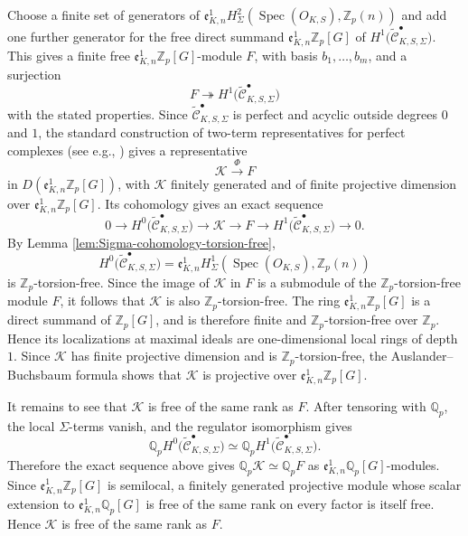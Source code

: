 \documentclass[a4paper,11pt]{article}
\newenvironment{proof}[1][Proof]{\begin{trivlist}
\item[\hskip \labelsep {\bfseries #1}]}{\end{trivlist}}
\begin{document}
\begin{proof}
Choose a finite set of generators of
\(
\mathfrak e^1_{K,n}
H^2_{\Sigma}(\operatorname{Spec}(O_{K,S}),\mathbb Z_p(n))
\)
and add one further generator for the free direct summand
\(
\mathfrak e^1_{K,n}\mathbb Z_p[G]
\)
of
\(
H^1\bigl(\widetilde{\mathcal C}_{K,S,\Sigma}^{\bullet}\bigr).
\)
This gives a finite free $\mathfrak e^1_{K,n}\mathbb Z_p[G]$-module $F$, with
basis $b_1,\ldots,b_m$, and a surjection
\[
F
\twoheadrightarrow
H^1\bigl(\widetilde{\mathcal C}_{K,S,\Sigma}^{\bullet}\bigr)
\]
with the stated properties.
Since $\widetilde{\mathcal C}_{K,S,\Sigma}^{\bullet}$ is perfect and acyclic
outside degrees $0$ and $1$, the standard construction of two-term
representatives for perfect complexes (see e.g., \cite[\S 3]{Burns00}) gives a representative
\[
\mathcal K
\stackrel{\Phi}{\longrightarrow}
F
\]
in $D(\mathfrak e^1_{K,n}\mathbb Z_p[G])$, with $\mathcal K$ finitely generated
and of finite projective dimension over
$\mathfrak e^1_{K,n}\mathbb Z_p[G]$. Its cohomology gives an exact sequence
\[
0
\longrightarrow
H^0\bigl(\widetilde{\mathcal C}_{K,S,\Sigma}^{\bullet}\bigr)
\longrightarrow
\mathcal K
\longrightarrow
F
\longrightarrow
H^1\bigl(\widetilde{\mathcal C}_{K,S,\Sigma}^{\bullet}\bigr)
\longrightarrow
0.
\]
By Lemma \ref{lem:Sigma-cohomology-torsion-free},
\[
H^0\bigl(\widetilde{\mathcal C}_{K,S,\Sigma}^{\bullet}\bigr)
=
\mathfrak e^1_{K,n}
H^1_{\Sigma}(\operatorname{Spec}(O_{K,S}),\mathbb Z_p(n))
\]
is $\mathbb Z_p$-torsion-free. Since the image of $\mathcal K$ in $F$ is a
submodule of the $\mathbb Z_p$-torsion-free module $F$, it follows that
$\mathcal K$ is also $\mathbb Z_p$-torsion-free.
The ring $\mathfrak e^1_{K,n}\mathbb Z_p[G]$ is a direct summand of
$\mathbb Z_p[G]$, and is therefore finite and $\mathbb Z_p$-torsion-free over
$\mathbb Z_p$. Hence its localizations at maximal ideals are one-dimensional
local rings of depth $1$. Since $\mathcal K$ has finite projective dimension
and is $\mathbb Z_p$-torsion-free, the Auslander--Buchsbaum formula \cite[Thm. 19.9]{Eisenbud} shows that
$\mathcal K$ is projective over
$\mathfrak e^1_{K,n}\mathbb Z_p[G]$.

It remains to see that $\mathcal K$ is free of the same rank as $F$. After
tensoring with $\mathbb Q_p$, the local $\Sigma$-terms vanish, and the
regulator isomorphism gives
\[
\mathbb Q_p
H^0\bigl(\widetilde{\mathcal C}_{K,S,\Sigma}^{\bullet}\bigr)
\simeq
\mathbb Q_p
H^1\bigl(\widetilde{\mathcal C}_{K,S,\Sigma}^{\bullet}\bigr).
\]
Therefore the exact sequence above gives
\(
\mathbb Q_p\mathcal K
\simeq
\mathbb Q_pF
\)
as
$\mathfrak e^1_{K,n}\mathbb Q_p[G]$-modules. Since
$\mathfrak e^1_{K,n}\mathbb Z_p[G]$ is semilocal, a finitely generated
projective module whose scalar extension to
$\mathfrak e^1_{K,n}\mathbb Q_p[G]$ is free of the same rank on every factor is
itself free. Hence $\mathcal K$ is free of the same rank as $F$.


\end{proof}
\end{document}
